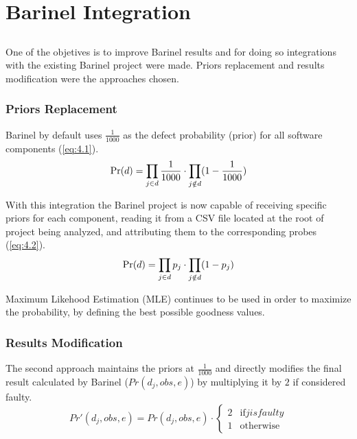 \chapter{Barinel Integration}\label{chap:chap4}

\section*{}

One of the objetives is to improve Barinel results and for doing so integrations with the existing Barinel project were made.
Priors replacement and results modification were the approaches chosen.

\subsection{Priors Replacement}

Barinel by default uses $\frac{1}{1000}$ as the defect probability (prior) for all software components (\ref{eq:4.1}).
%
\begin{equation} \label{eq:4.1}
  \mbox{Pr}(d) = \prod_{j \in d} \frac{1}{1000} \cdot \prod_{j \notin d} (1 - \frac{1}{1000})
\end{equation}

With this integration the Barinel project is now capable of receiving specific priors for each component, reading it from a CSV file located at the root of project being analyzed, and attributing them to the corresponding probes (\ref{eq:4.2}).
%
\begin{equation} \label{eq:4.2}
  \mbox{Pr}(d) = \prod_{j \in d} p_j \cdot \prod_{j \notin d} (1 - p_j)
\end{equation}


Maximum Likehood Estimation (MLE) continues to be used in order to maximize the probability, by defining the best possible goodness values.

\subsection{Results Modification}

The second approach maintains the priors at $\frac{1}{1000}$ and directly modifies the final result calculated by Barinel ($Pr(d_j, obs, e)$) by multiplying it by $2$ if considered faulty.
%
\begin{equation} \label{eq:4.2}
  Pr'(d_j, obs, e) = Pr(d_j, obs, e) \cdot 
  \begin{cases}
    2   & \textrm{if} j is faulty \\
	1  	& \textrm{otherwise}
  \end{cases}
\end{equation}

